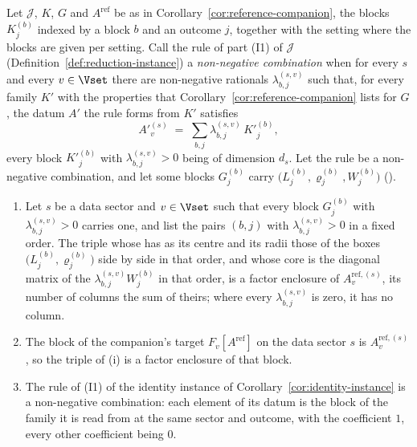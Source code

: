 \begin{corollary}\label{cor:companion-factor-enclosure}
Let $\mathcal{J}$, $K$, $G$ and $A^{\mathrm{ref}}$ be as in
Corollary~\ref{cor:reference-companion}, the blocks $K^{(b)}_j$ indexed by a
block $b$ and an outcome $j$, together with the setting where the blocks are
given per setting. Call the rule of part (I1) of $\mathcal{J}$
(Definition~\ref{def:reduction-instance}) a \emph{non-negative combination}
when for every  $s$ and every $v\in\Vset$ there are
non-negative rationals $\lambda^{(s,v)}_{b,j}$ such that, for every family
$K'$ with the properties that Corollary~\ref{cor:reference-companion} lists
for $G$, the datum $A'$ the rule forms from $K'$ satisfies
\begin{equation}\label{eq:datum-combination}
  A'^{(s)}_v\;=\;\sum_{b,j}\lambda^{(s,v)}_{b,j}\,K'^{(b)}_j ,
\end{equation}
every block $K'^{(b)}_j$ with $\lambda^{(s,v)}_{b,j}>0$ being of dimension
$d_s$. Let the rule be a non-negative combination, and let some blocks
$G^{(b)}_j$ carry 
$\big(L^{(b)}_{j},\varrho^{(b)}_{j},W^{(b)}_{j}\big)$
().
\begin{enumerate}[label=(\roman*),leftmargin=3.0em]
\item Let $s$ be a data sector and $v\in\Vset$ such that every block
  $G^{(b)}_j$ with $\lambda^{(s,v)}_{b,j}>0$ carries one, and list the pairs
  $(b,j)$ with $\lambda^{(s,v)}_{b,j}>0$ in a fixed order. The triple whose
   has as its centre and its radii those of the boxes
  $\big(L^{(b)}_{j},\varrho^{(b)}_{j}\big)$ side by side in that order, and
  whose core is the diagonal matrix of the
  $\lambda^{(s,v)}_{b,j}W^{(b)}_{j}$ in that order, is a factor enclosure of
  $A^{\mathrm{ref},(s)}_v$, its number of columns the sum of theirs; where
  every $\lambda^{(s,v)}_{b,j}$ is zero, it has no column.
\item The block of the companion's target $F_v[A^{\mathrm{ref}}]$ on the data
  sector $s$ is $A^{\mathrm{ref},(s)}_v$, so the triple of (i) is a factor
  enclosure of that block.
\item The rule of (I1) of the identity instance of
  Corollary~\ref{cor:identity-instance} is a non-negative combination: each
  element of its datum is the block of the family it is read from at the
  same sector and outcome, with the coefficient $1$, every other coefficient
  being $0$.
\end{enumerate}
\end{corollary}


